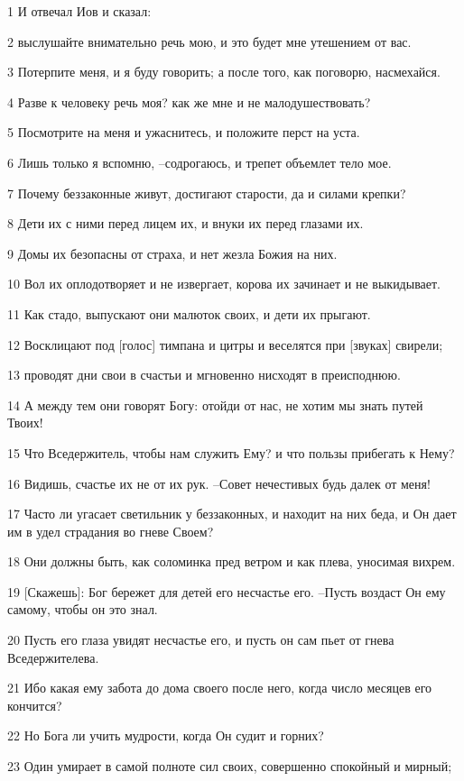 \par 1 И отвечал Иов и сказал:
\par 2 выслушайте внимательно речь мою, и это будет мне утешением от вас.
\par 3 Потерпите меня, и я буду говорить; а после того, как поговорю, насмехайся.
\par 4 Разве к человеку речь моя? как же мне и не малодушествовать?
\par 5 Посмотрите на меня и ужаснитесь, и положите перст на уста.
\par 6 Лишь только я вспомню, --содрогаюсь, и трепет объемлет тело мое.
\par 7 Почему беззаконные живут, достигают старости, да и силами крепки?
\par 8 Дети их с ними перед лицем их, и внуки их перед глазами их.
\par 9 Домы их безопасны от страха, и нет жезла Божия на них.
\par 10 Вол их оплодотворяет и не извергает, корова их зачинает и не выкидывает.
\par 11 Как стадо, выпускают они малюток своих, и дети их прыгают.
\par 12 Восклицают под [голос] тимпана и цитры и веселятся при [звуках] свирели;
\par 13 проводят дни свои в счастьи и мгновенно нисходят в преисподнюю.
\par 14 А между тем они говорят Богу: отойди от нас, не хотим мы знать путей Твоих!
\par 15 Что Вседержитель, чтобы нам служить Ему? и что пользы прибегать к Нему?
\par 16 Видишь, счастье их не от их рук. --Совет нечестивых будь далек от меня!
\par 17 Часто ли угасает светильник у беззаконных, и находит на них беда, и Он дает им в удел страдания во гневе Своем?
\par 18 Они должны быть, как соломинка пред ветром и как плева, уносимая вихрем.
\par 19 [Скажешь]: Бог бережет для детей его несчастье его. --Пусть воздаст Он ему самому, чтобы он это знал.
\par 20 Пусть его глаза увидят несчастье его, и пусть он сам пьет от гнева Вседержителева.
\par 21 Ибо какая ему забота до дома своего после него, когда число месяцев его кончится?
\par 22 Но Бога ли учить мудрости, когда Он судит и горних?
\par 23 Один умирает в самой полноте сил своих, совершенно спокойный и мирный;
